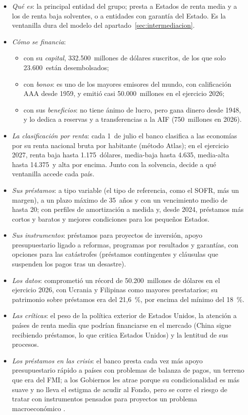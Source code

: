 \documentclass[11pt]{article}
\begin{document}
\begin{itemize}
\item \emph{Qué es}: la principal entidad del grupo; presta a Estados de renta media y a los de renta baja solventes, o a entidades con garantía del Estado. Es la ventanilla dura del modelo del apartado~\ref{sec:intermediacion}.
\item \emph{Cómo se financia}:
  \begin{itemize}
  \item con su \emph{capital}, 332.500~millones de dólares suscritos, de los que solo 23.600~están desembolsados\nocite{BM2026InformeAnual};
  \item con \emph{bonos}: es uno de los mayores emisores del mundo, con calificación AAA desde 1959, y emitió casi 50.000~millones en el ejercicio 2026\nocite{BM2026InformeAnual};
  \item con sus \emph{beneficios}: no tiene ánimo de lucro, pero gana dinero desde 1948, y lo dedica a reservas y a transferencias a la AIF (750~millones en 2026)\nocite{BM2026InformeAnual}.
  \end{itemize}
\item \emph{La clasificación por renta}: cada 1~de julio el banco clasifica a las economías por su renta nacional bruta por habitante (método Atlas); en el ejercicio 2027, renta baja hasta 1.175~dólares, media-baja hasta 4.635, media-alta hasta 14.375~y alta por encima. Junto con la solvencia, decide a qué ventanilla accede cada país\nocite{BM2026Clasificacion}.
\item \emph{Sus préstamos}: a tipo variable (el tipo de referencia, como el SOFR, más un margen), a un plazo máximo de 35~años y con un vencimiento medio de hasta 20; con perfiles de amortización a medida y, desde 2024, préstamos más cortos y baratos y mejores condiciones para los pequeños Estados\nocite{BM2024Evolucion}.
\item \emph{Sus instrumentos}: préstamos para proyectos de inversión, apoyo presupuestario ligado a reformas, programas por resultados y garantías, con opciones para las catástrofes (préstamos contingentes y cláusulas que suspenden los pagos tras un desastre).
\item \emph{Los datos}: comprometió un récord de 50.200~millones de dólares en el ejercicio 2026, con Ucrania y Filipinas como mayores prestatarios; su patrimonio sobre préstamos era del 21,6~\%, por encima del mínimo del 18~\%\nocite{BM2026InformeAnual}.
\item \emph{Las críticas}: el peso de la política exterior de Estados Unidos, la atención a países de renta media que podrían financiarse en el mercado (China sigue recibiendo préstamos, lo que critica Estados Unidos) y la lentitud de sus procesos\nocite{Ravallion2016}.
\item \emph{Los préstamos en las crisis}: el banco presta cada vez más apoyo presupuestario rápido a países con problemas de balanza de pagos, un terreno que era del FMI; a los Gobiernos les atrae porque su condicionalidad es más suave y no lleva el estigma de acudir al Fondo, pero se corre el riesgo de tratar con instrumentos pensados para proyectos un problema macroeconómico .
\end{itemize}
\end{document}
